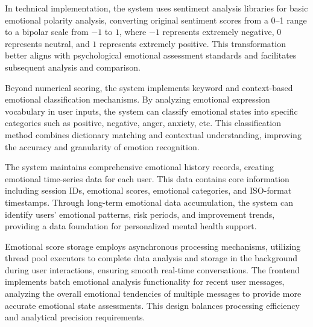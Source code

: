 In technical implementation, the system uses sentiment analysis libraries for basic emotional polarity analysis, converting original sentiment scores from a 0--1 range to a bipolar scale from $-1$ to $1$, where $-1$ represents extremely negative, $0$ represents neutral, and $1$ represents extremely positive. This transformation better aligns with psychological emotional assessment standards and facilitates subsequent analysis and comparison.

Beyond numerical scoring, the system implements keyword and context-based emotional classification mechanisms. By analyzing emotional expression vocabulary in user inputs, the system can classify emotional states into specific categories such as positive, negative, anger, anxiety, etc. This classification method combines dictionary matching and contextual understanding, improving the accuracy and granularity of emotion recognition.

The system maintains comprehensive emotional history records, creating emotional time-series data for each user. This data contains core information including session IDs, emotional scores, emotional categories, and ISO-format timestamps. Through long-term emotional data accumulation, the system can identify users' emotional patterns, risk periods, and improvement trends, providing a data foundation for personalized mental health support.

Emotional score storage employs asynchronous processing mechanisms, utilizing thread pool executors to complete data analysis and storage in the background during user interactions, ensuring smooth real-time conversations. The frontend implements batch emotional analysis functionality for recent user messages, analyzing the overall emotional tendencies of multiple messages to provide more accurate emotional state assessments. This design balances processing efficiency and analytical precision requirements.